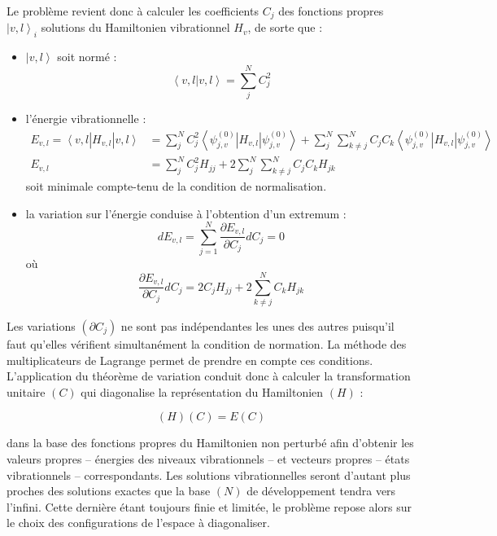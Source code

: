 Le problème revient donc à calculer les coefficients $C_j$ des fonctions propres $\left|v,l\right\rangle_i$ solutions du Hamiltonien vibrationnel $H_v$, de sorte que :

\begin{itemize}
	\item $\left|v,l\right\rangle$ soit normé : 
	\begin{equation}
	\left\langle v,l\right|\left. v ,l\right\rangle = \sum^N_j C^2_j
	\end{equation}
	\item l'énergie vibrationnelle : 
	\begin{align}
	E_{v,l} = \left\langle v,l\right. \left|H_{v,l}\right|\left. v,l\right\rangle &= \sum^N_j C^2_j \left\langle \psi^{(0)}_{j,v}\right. \left|H_{v,l}\right|\left. \psi^{(0)}_{j,v}\right\rangle + \sum^N_j \sum^N_{k\neq j}C_jC_k \left\langle \psi^{(0)}_{j,v}\right. \left|H_{v,l}\right|\left. \psi^{(0)}_{j,v}\right\rangle \\
	E_{v,l} &= \sum^N_j C^2_j H_{jj} + 2 \sum^N_j \sum^N_{k\neq j} C_jC_k H_{jk}
	\end{align}
	\noindent soit minimale compte-tenu de la condition de normalisation.
	\item la variation sur l'énergie conduise à l'obtention d'un extremum : 
	\begin{equation}
	dE_{v,l} = \sum^N_{j=1} \frac{\partial E_{v,l}}{\partial C_j}dC_j = 0 	
	\end{equation}
	\noindent où
	\begin{equation}
	\frac{\partial E_{v,l}}{\partial C_j}dC_j = 2C_jH_{jj} + 2\sum^N_{k\neq j} C_kH_{jk}
	\end{equation}
\end{itemize}


Les variations $(\partial C_j)$ ne sont pas indépendantes les unes des autres puisqu'il faut qu'elles vérifient simultanément la condition de normation. La méthode des multiplicateurs de Lagrange permet de prendre en compte ces conditions. L'application du théorème de variation conduit donc à calculer la transformation unitaire $(C)$ qui diagonalise la représentation du Hamiltonien $(H)$ :

\begin{equation}
(H)(C) = E (C)
\end{equation}

\noindent dans la base des fonctions propres du Hamiltonien non perturbé afin d'obtenir les valeurs propres -- énergies des niveaux vibrationnels -- et vecteurs propres -- états vibrationnels -- correspondants. Les solutions vibrationnelles seront d'autant plus proches des solutions exactes que la base $(N)$ de développement tendra vers l'infini. Cette dernière étant toujours finie et limitée, le problème repose alors sur le choix des configurations de l'espace à diagonaliser.


